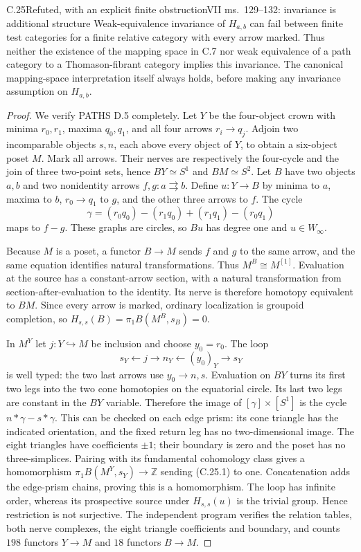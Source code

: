 \begin{claim}{C.25}{Refuted, with an explicit finite obstruction}{VII ms.~129--132: invariance is additional structure}
Weak-equivalence invariance of $H_{a,b}$ can fail between finite
test categories for a finite relative category with every arrow
marked. Thus neither the existence of the mapping space in C.7
nor weak equivalence of a path category to a Thomason-fibrant
category implies this invariance. The canonical mapping-space
interpretation itself always holds, before making any invariance
assumption on $H_{a,b}$.
\end{claim}
\begin{proof}
We verify PATHS D.5 completely. Let $Y$ be the four-object crown
with minima $r_0,r_1$, maxima $q_0,q_1$, and all four arrows
$r_i\to q_j$. Adjoin two incomparable objects $s,n$, each above
every object of $Y$, to obtain a six-object poset $M$. Mark all
arrows. Their nerves are respectively the four-cycle and the
join of three two-point sets, hence $BY\simeq S^1$ and
$BM\simeq S^2$. Let $B$ have two objects $a,b$ and two
nonidentity arrows $f,g:a\rightrightarrows b$. Define $u:Y\to B$
by minima to $a$, maxima to $b$, $r_0\to q_1$ to $g$, and the
other three arrows to $f$. The cycle
\[
 \gamma=(r_0q_0)-(r_1q_0)+(r_1q_1)-(r_0q_1)
\]
maps to $f-g$. These graphs are circles, so $Bu$ has degree one
and $u\in W_\infty$.

Because $M$ is a poset, a functor $B\to M$ sends $f$ and $g$
to the same arrow, and the same equation identifies natural
transformations. Thus $M^B\cong M^{[1]}$. Evaluation at the
source has a constant-arrow section, with a natural transformation
from section-after-evaluation to the identity. Its nerve is
therefore homotopy equivalent to $BM$. Since every arrow is
marked, ordinary localization is groupoid completion, so
$H_{s,s}(B)=\pi_1 B(M^B,s_B)=0$.

In $M^Y$ let $j:Y\hookrightarrow M$ be inclusion and choose
$y_0=r_0$. The loop
\[
 s_Y\longleftarrow j\longrightarrow n_Y
       \longleftarrow (y_0)_Y\longrightarrow s_Y
                                                               \tag{C.25.1}
\]
is well typed: the two last arrows use $y_0\to n,s$. Evaluation
on $BY$ turns its first two legs into the two cone homotopies on
the equatorial circle. Its last two legs are constant in the
$BY$ variable. Therefore the image of $[\gamma]\times[S^1]$
is the cycle $n*\gamma-s*\gamma$. This can be checked on
each edge prism: its cone triangle has the indicated orientation,
and the fixed return leg has no two-dimensional image. The eight
triangles have coefficients $\pm1$; their boundary is zero and
the poset has no three-simplices. Pairing with its fundamental
cohomology class gives a homomorphism
$\pi_1B(M^Y,s_Y)\to\mathbb Z$ sending (C.25.1) to one.
Concatenation adds the edge-prism chains, proving this is a
homomorphism. The loop has infinite order, whereas its prospective
source under $H_{s,s}(u)$ is the trivial group. Hence restriction
is not surjective. The independent program verifies the relation
tables, both nerve complexes, the eight triangle coefficients and
boundary, and counts $198$ functors $Y\to M$ and $18$ functors
$B\to M$.


\end{proof}
